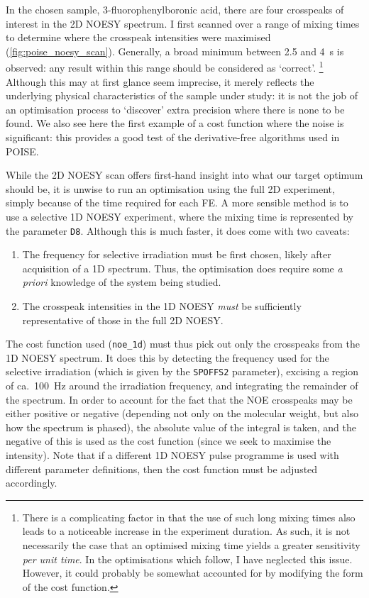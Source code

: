 In the chosen sample, 3-fluorophenylboronic acid, there are four crosspeaks of interest in the 2D NOESY spectrum.
I first scanned over a range of mixing times to determine where the crosspeak intensities were maximised (\cref{fig:poise_noesy_scan}).
Generally, a broad minimum between 2.5 and \SI{4}{\s} is observed: any result within this range should be considered as `correct'.%
\footnote{There is a complicating factor in that the use of such long mixing times also leads to a noticeable increase in the experiment duration. As such, it is not necessarily the case that an optimised mixing time yields a greater sensitivity \textit{per unit time}. In the optimisations which follow, I have neglected this issue. However, it could probably be somewhat accounted for by modifying the form of the cost function.}
Although this may at first glance seem imprecise, it merely reflects the underlying physical characteristics of the sample under study: it is not the job of an optimisation process to `discover' extra precision where there is none to be found.
We also see here the first example of a cost function where the noise is significant: this provides a good test of the derivative-free algorithms used in POISE.

While the 2D NOESY scan offers first-hand insight into what our target optimum should be, it is unwise to run an optimisation using the full 2D experiment, simply because of the time required for each FE.
A more sensible method is to use a selective 1D NOESY experiment, where the mixing time is represented by the parameter \texttt{D8}.
Although this is much faster, it does come with two caveats:
\begin{enumerate}
    \item The frequency for selective irradiation must be first chosen, likely after acquisition of a 1D \proton{} spectrum.
        Thus, the optimisation does require some \textit{a priori} knowledge of the system being studied.
    \item The crosspeak intensities in the 1D NOESY \textit{must} be sufficiently representative of those in the full 2D NOESY.
\end{enumerate}

The cost function used (\texttt{noe\_1d}) must thus pick out only the crosspeaks from the 1D NOESY spectrum.
It does this by detecting the frequency used for the selective irradiation (which is given by the \texttt{SPOFFS2} parameter), excising a region of ca.\ \SI{100}{\Hz} around the irradiation frequency, and integrating the remainder of the spectrum.
In order to account for the fact that the NOE crosspeaks may be either positive or negative (depending not only on the molecular weight, but also how the spectrum is phased), the absolute value of the integral is taken, and the negative of this is used as the cost function (since we seek to maximise the intensity).
Note that if a different 1D NOESY pulse programme is used with different parameter definitions, then the cost function must be adjusted accordingly.

